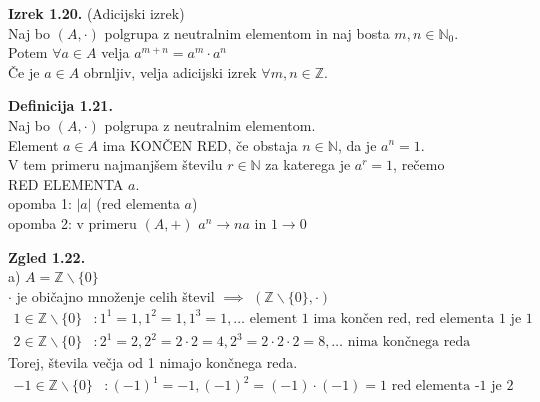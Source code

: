\documentclass[12pt]{article}
\begin{document}
\vspace*{24pt}


\noindent
\textbf{Izrek 1.20.} (Adicijski izrek) \\
Naj bo $(A, \cdot)$ polgrupa z neutralnim elementom in naj bosta $m, n \in \mathbb{N}_0$. \\
Potem $\forall a \in A$ velja $a^{m + n} = a^m \cdot a^n$ \\
Če je $a \in A$ obrnljiv, velja adicijski izrek $\forall m, n \in \mathbb{Z}$.



\vspace*{24pt}


\noindent
\textbf{Definicija 1.21.} \\
Naj bo $(A, \cdot)$ polgrupa z neutralnim elementom. \\
Element $a \in A$ ima KONČEN RED, če obstaja $n \in \mathbb{N}$, da je $a^n = 1$. \\
V tem primeru najmanjšem številu $r \in \mathbb{N}$ za katerega je $a^r = 1$, rečemo \\
RED ELEMENTA $a$. \\[1em]
opomba 1: $|a|$ (red elementa $a$) \\
opomba 2: v primeru $(A, +)$ $a^n \to na$ in $1 \to 0$



\vspace*{24pt}


\noindent
\textbf{Zgled 1.22.} \\[1em]
a)  $A = \mathbb{Z} \backslash \{ 0 \}$ \\
\hspace*{1em} $\cdot$ je običajno množenje celih števil $\implies$ $(\mathbb{Z} \backslash \{0\}, \cdot)$ 
\begin{align*}
    1 \in \mathbb{Z} \backslash \{0\} &: 1^1 = 1, 1^2 = 1, 1^3 = 1, \dots \text{ element 1 ima končen red, red elementa 1 je 1} \\
    2 \in \mathbb{Z} \backslash \{0\} &: 2^1 = 2, 2^2 = 2 \cdot 2 = 4, 2^3 = 2 \cdot 2 \cdot 2 = 8, \dots \text{ nima končnega reda}
\end{align*}
Torej, števila večja od 1 nimajo končnega reda.
\begin{align*}
    -1 \in \mathbb{Z} \backslash \{0\} &: (-1)^1 = -1, (-1)^2 = (-1) \cdot (-1) = 1 \text{ red elementa -1 je 2}
\end{align*} \\
\end{document}
